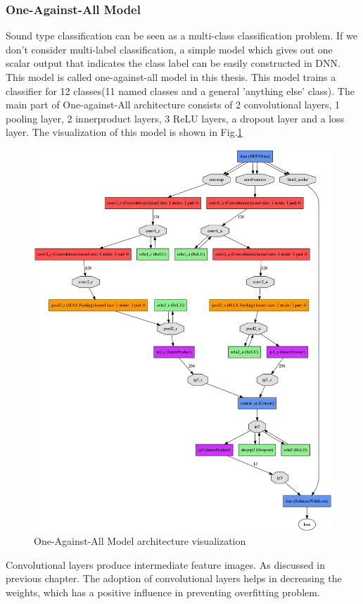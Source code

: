 \subsubsection{One-Against-All Model}
Sound type classification can be seen as a multi-class classification problem. If we don't consider multi-label classification, a simple model which gives out one scalar output that indicates the class label can be easily constructed in DNN. This model is called one-against-all model in this thesis. This model trains a classifier for 12 classes(11 named classes and a general 'anything else' class). The main part of One-against-All architecture consists of 2 convolutional layers, 1 pooling layer, 2 innerproduct layers, 3 ReLU layers, a dropout layer and a loss layer. The visualization of this model is shown in Fig.\ref{fig:one-vs-all}

\begin{figure}[h!]
\includegraphics[scale=0.33]{../image/chapter2/one-vs-all.png}
\caption{One-Against-All Model architecture visualization}
\label{fig:one-vs-all}
\end{figure}
Convolutional layers produce intermediate feature images. As discussed in previous chapter. The adoption of convolutional layers helps in decreasing the weights, which has a positive influence in preventing overfitting problem. 
 
